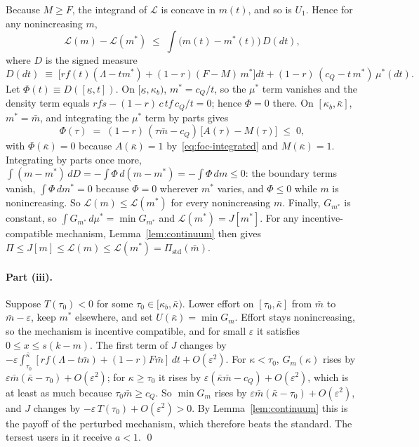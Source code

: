 \documentclass[11pt]{article}
\begin{document}
Because $M \ge F$, the integrand of $\mathcal{L}$ is concave in $m(t)$, and so is $U_1$. Hence for any nonincreasing $m$,
\[
\mathcal{L}(m) - \mathcal{L}(m^*) \;\le\; \int \big(m(t) - m^*(t)\big)\, D(dt),
\]
where $D$ is the signed measure
\[
D(dt) \;\equiv\; \Big[ r f(t)(\Lambda - t m^*) + (1-r)(F - M)\,m^* \Big] dt + (1-r)\,(c_Q - t\,m^*)\,\mu^*(dt).
\]
Let $\Phi(t) \equiv D([\underline\kappa, t])$. On $[\underline\kappa, \kappa_b)$, $m^* = c_Q/t$, so the $\mu^*$ term vanishes and the density term equals $r f s - (1-r)\,c\,t f\,c_Q/t = 0$; hence $\Phi = 0$ there. On $[\kappa_b, \bar\kappa]$, $m^* = \bar m$, and integrating the $\mu^*$ term by parts gives
\[
\Phi(\tau) \;=\; (1-r)\,(\tau\bar m - c_Q)\,\big[A(\tau) - M(\tau)\big] \;\le\; 0,
\]
with $\Phi(\bar\kappa) = 0$ because $A(\bar\kappa) = 1$ by~\eqref{eq:foc-integrated} and $M(\bar\kappa) = 1$. Integrating by parts once more, $\int (m - m^*)\,dD = -\int \Phi\, d(m - m^*) = -\int \Phi\,dm \le 0$: the boundary terms vanish, $\int \Phi\,dm^* = 0$ because $\Phi = 0$ wherever $m^*$ varies, and $\Phi \le 0$ while $m$ is nonincreasing. So $\mathcal{L}(m) \le \mathcal{L}(m^*)$ for every nonincreasing $m$. Finally, $G_{m^*}$ is constant, so $\int G_{m^*}\,d\mu^* = \min G_{m^*}$ and $\mathcal{L}(m^*) = J[m^*]$. For any incentive-compatible mechanism, Lemma~\ref{lem:continuum} then gives $\Pi \le J[m] \le \mathcal{L}(m) \le \mathcal{L}(m^*) = \Pi_{\text{std}}(\bar m)$.

\paragraph{Part (iii).} Suppose $T(\tau_0) < 0$ for some $\tau_0 \in [\kappa_b, \bar\kappa)$. Lower effort on $[\tau_0, \bar\kappa]$ from $\bar m$ to $\bar m - \varepsilon$, keep $m^*$ elsewhere, and set $U(\bar\kappa) = \min G_m$. Effort stays nonincreasing, so the mechanism is incentive compatible, and for small $\varepsilon$ it satisfies $0 \le x \le s(k-m)$. The first term of $J$ changes by $-\varepsilon\int_{\tau_0}^{\bar\kappa} [r f(\Lambda - t\bar m) + (1-r) F\bar m]\,dt + O(\varepsilon^2)$. For $\kappa < \tau_0$, $G_m(\kappa)$ rises by $\varepsilon\bar m(\bar\kappa - \tau_0) + O(\varepsilon^2)$; for $\kappa \ge \tau_0$ it rises by $\varepsilon(\bar\kappa\bar m - c_Q) + O(\varepsilon^2)$, which is at least as much because $\tau_0\bar m \ge c_Q$. So $\min G_m$ rises by $\varepsilon\bar m(\bar\kappa - \tau_0) + O(\varepsilon^2)$, and $J$ changes by $-\varepsilon\, T(\tau_0) + O(\varepsilon^2) > 0$. By Lemma~\ref{lem:continuum} this is the payoff of the perturbed mechanism, which therefore beats the standard. The tersest users in it receive $a < 1$.
\qed
\end{document}
